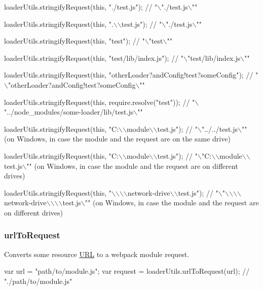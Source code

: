 \begin{DoxyCode}
loaderUtils.stringifyRequest(this, "./test.js");
// "\(\backslash\)"./test.js\(\backslash\)""

loaderUtils.stringifyRequest(this, ".\(\backslash\)\(\backslash\)test.js");
// "\(\backslash\)"./test.js\(\backslash\)""

loaderUtils.stringifyRequest(this, "test");
// "\(\backslash\)"test\(\backslash\)""

loaderUtils.stringifyRequest(this, "test/lib/index.js");
// "\(\backslash\)"test/lib/index.js\(\backslash\)""

loaderUtils.stringifyRequest(this, "otherLoader?andConfig!test?someConfig");
// "\(\backslash\)"otherLoader?andConfig!test?someConfig\(\backslash\)""

loaderUtils.stringifyRequest(this, require.resolve("test"));
// "\(\backslash\)"../node\_modules/some-loader/lib/test.js\(\backslash\)""

loaderUtils.stringifyRequest(this, "C:\(\backslash\)\(\backslash\)module\(\backslash\)\(\backslash\)test.js");
// "\(\backslash\)"../../test.js\(\backslash\)"" (on Windows, in case the module and the request are on the same drive)

loaderUtils.stringifyRequest(this, "C:\(\backslash\)\(\backslash\)module\(\backslash\)\(\backslash\)test.js");
// "\(\backslash\)"C:\(\backslash\)\(\backslash\)module\(\backslash\)\(\backslash\)test.js\(\backslash\)"" (on Windows, in case the module and the request are on different drives)

loaderUtils.stringifyRequest(this, "\(\backslash\)\(\backslash\)\(\backslash\)\(\backslash\)network-drive\(\backslash\)\(\backslash\)test.js");
// "\(\backslash\)"\(\backslash\)\(\backslash\)\(\backslash\)\(\backslash\)network-drive\(\backslash\)\(\backslash\)\(\backslash\)\(\backslash\)test.js\(\backslash\)"" (on Windows, in case the module and the request are on different
       drives)
\end{DoxyCode}


\subsubsection*{{\ttfamily url\+To\+Request}}

Converts some resource \mbox{\hyperlink{namespace_u_r_l}{U\+RL}} to a webpack module request.


\begin{DoxyCode}
var url = "path/to/module.js";
var request = loaderUtils.urlToRequest(url); // "./path/to/module.js"
\end{DoxyCode}


